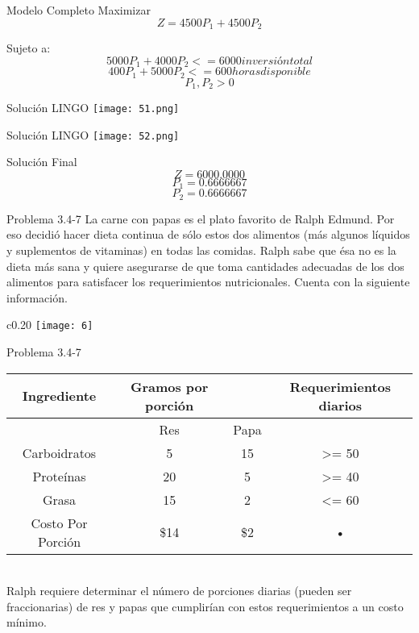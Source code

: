 \documentclass{beamer}
\begin{document}
\begin{frame}[fragile]{Modelo Completo}
Maximizar\\
\[Z = 4500P_{1} + 4500P_{2}\]

Sujeto a:\\
\[5000P_{1} + 4000P_{2} <= 6000 inversión total\]
\[400P_{1} + 5000P_{2} <= 600 horas disponible\]
\[P_{1}, P_{2} > 0\]

\end{frame}

\begin{frame}[fragile]{Solución LINGO}
    \texttt{[image: 51.png]}
\end{frame}
\begin{frame}[fragile]{Solución LINGO}
    \texttt{[image: 52.png]}
\end{frame}

\begin{frame}[fragile]{Solución Final}
\[Z = 6 000.0000\]
\[P_{1} = 0.6666667\]
\[P_{2} = 0.6666667\]
\end{frame}

\begin{frame}[t,fragile]{Problema 3.4-7}
La carne con papas es el plato favorito de Ralph Edmund. Por eso decidió hacer dieta continua de sólo estos dos alimentos (más algunos líquidos y suplementos de vitaminas) en todas las comidas. Ralph sabe que ésa no es la dieta más sana y quiere asegurarse de que toma cantidades adecuadas de  los dos alimentos para satisfacer los requerimientos nutricionales. Cuenta con la siguiente información.\begin{wrapfigure}{c}{0.20\textwidth}
    \centering
    \texttt{[image: 6]}
\end{wrapfigure}
\end{frame}
\begin{frame}[t,fragile]{Problema 3.4-7}

\begin{tabular}{|c|c|c|c|}
\hline 
Ingrediente & Gramos por porción &   & Requerimientos diarios\\ 
\hline 
  & Res & Papa &   \\ 
\hline 
Carboidratos & 5 & 15 & >= 50 \\ 
\hline 
Proteínas & 20 & 5 & >= 40 \\ 
\hline 
Grasa & 15 & 2 & <= 60 \\ 
\hline 
Costo Por Porción & \$14 & \$2 & • \\ 
\hline 
\end{tabular} \\
Ralph requiere determinar el número de porciones diarias (pueden ser fraccionarias) de res y  papas que cumplirían con estos requerimientos a un costo mínimo.
\end{frame}
\end{document}
